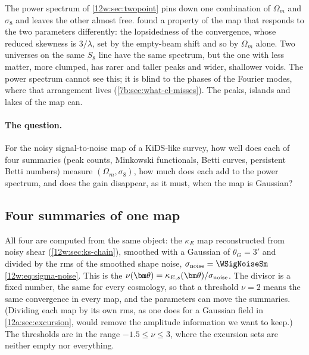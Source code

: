 The power spectrum of \cref{12w:sec:twopoint} pins down one combination of $\Omega_m$ and $\sigma_8$ and leaves the
other almost free.  found a property of the map that responds to the two parameters
differently: the lopsidedness of the convergence, whose reduced skewness is $3/\lambda$, set by the empty-beam shift
and so by $\Omega_m$ alone. Two universes on the same $S_8$ line have the same spectrum, but the one with less
matter, more clumped, has rarer and taller peaks and wider, shallower voids. The power spectrum cannot see this; it
is blind to the phases of the Fourier modes, where that arrangement lives (\cref{7b:sec:what-cl-misses}). The peaks,
islands and lakes of the map can.

\paragraph{The question.} For the noisy signal-to-noise map of a KiDS-like survey, how well does each of four
summaries (peak counts, Minkowski functionals, Betti curves, persistent Betti numbers) measure $(\Omega_m,\sigma_8)$,
how much does each add to the power spectrum, and does the gain disappear, as it must, when the map is Gaussian?

\subsection{Four summaries of one map}
\label{12w:sec:summaries}

All four are computed from the same object: the $\kappa_E$ map reconstructed from noisy shear
(\cref{12w:sec:ks-chain}), smoothed with a Gaussian of $\theta_G=3'$ and divided by the rms of the smoothed shape
noise, $\sigma_{\rm noise}=\WSigNoiseSm$ \eqref{12w:eq:sigma-noise}. This is the 
$\nu(\bm\theta)=\kappa_{E,s}(\bm\theta)/\sigma_{\rm noise}$. The divisor is a fixed number, the same for every
cosmology, so that a threshold $\nu=2$ means the same convergence in every map, and the parameters can move the
summaries. (Dividing each map by its own rms, as one does for a Gaussian field in \cref{12a:sec:excursion}, would
remove the amplitude information we want to keep.) The thresholds are in the range $-1.5\le\nu\le3$, where the
excursion sets are neither empty nor everything.


